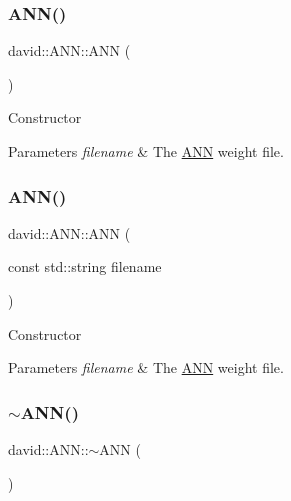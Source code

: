 \subsubsection{\texorpdfstring{A\+N\+N()}{ANN()}\hspace{0.1cm}{\footnotesize\ttfamily [1/2]}}
{\footnotesize\ttfamily david\+::\+A\+N\+N\+::\+A\+NN (\begin{DoxyParamCaption}{ }\end{DoxyParamCaption})}

Constructor 
\begin{DoxyParams}{Parameters}
{\em filename} & The \hyperlink{classdavid_1_1ANN}{A\+NN} weight file. \\
\hline
\end{DoxyParams}
\mbox{\label{classdavid_1_1ANN_a7c53c4d31d9af4d5ae48c176c1565956}} 
\subsubsection{\texorpdfstring{A\+N\+N()}{ANN()}\hspace{0.1cm}{\footnotesize\ttfamily [2/2]}}
{\footnotesize\ttfamily david\+::\+A\+N\+N\+::\+A\+NN (\begin{DoxyParamCaption}\item[{const std\+::string}]{filename }\end{DoxyParamCaption})}

Constructor 
\begin{DoxyParams}{Parameters}
{\em filename} & The \hyperlink{classdavid_1_1ANN}{A\+NN} weight file. \\
\hline
\end{DoxyParams}
\mbox{\label{classdavid_1_1ANN_a16c81190a4d252b98e7646aef0292439}} 
\subsubsection{\texorpdfstring{$\sim$\+A\+N\+N()}{~ANN()}}
{\footnotesize\ttfamily david\+::\+A\+N\+N\+::$\sim$\+A\+NN (\begin{DoxyParamCaption}{ }\end{DoxyParamCaption})}


